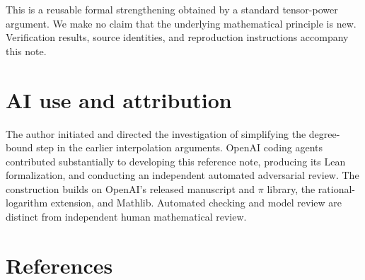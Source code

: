 \documentclass[11pt]{article}
\begin{document}
This is a reusable formal strengthening obtained by a standard tensor-power argument. We make no claim that the underlying mathematical principle is new. Verification results, source identities, and reproduction instructions accompany this note.

\section*{AI use and attribution}

The author initiated and directed the investigation of simplifying the degree-bound step in the earlier interpolation arguments. OpenAI coding agents contributed substantially to developing this reference note, producing its Lean formalization, and conducting an independent automated adversarial review. The construction builds on OpenAI's released manuscript and $\pi$ library, the rational-logarithm extension, and Mathlib. Automated checking and model review are distinct from independent human mathematical review.

\newpage
\section*{References}
\end{document}
